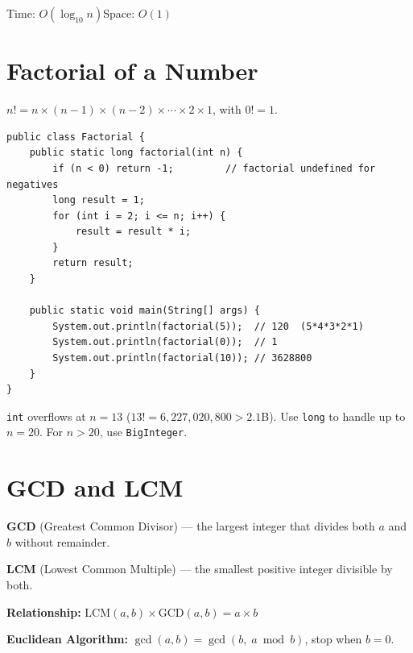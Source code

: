 \documentclass[12pt,a4paper,oneside]{book}
\begin{document}
\begin{complexity}
Time: $O(\log_{10} n)$\quad Space: $O(1)$
\end{complexity}

\section{Factorial of a Number}

$n! = n \times (n-1) \times (n-2) \times \cdots \times 2 \times 1$, with $0! = 1$.

\begin{lstlisting}[caption={Factorial --- Iterative approach}]
public class Factorial {
    public static long factorial(int n) {
        if (n < 0) return -1;         // factorial undefined for negatives
        long result = 1;
        for (int i = 2; i <= n; i++) {
            result = result * i;
        }
        return result;
    }

    public static void main(String[] args) {
        System.out.println(factorial(5));  // 120  (5*4*3*2*1)
        System.out.println(factorial(0));  // 1
        System.out.println(factorial(10)); // 3628800
    }
}
\end{lstlisting}

\begin{tipbox}
\texttt{int} overflows at $n = 13$ ($13! = 6{,}227{,}020{,}800 > 2.1$B). Use \texttt{long} to handle up to $n = 20$. For $n > 20$, use \texttt{BigInteger}.
\end{tipbox}

\section{GCD and LCM}

\textbf{GCD} (Greatest Common Divisor) --- the largest integer that divides both $a$ and $b$ without remainder.

\textbf{LCM} (Lowest Common Multiple) --- the smallest positive integer divisible by both.

\textbf{Relationship:} $\mathrm{LCM}(a,b) \times \mathrm{GCD}(a,b) = a \times b$

\textbf{Euclidean Algorithm:} $\gcd(a, b) = \gcd(b,\; a \bmod b)$, stop when $b = 0$.
\end{document}
